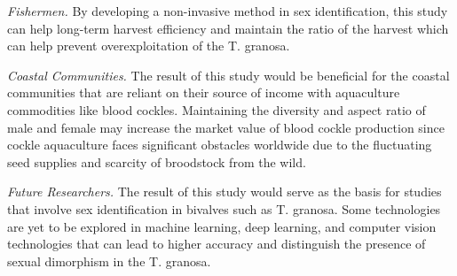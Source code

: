  \textit{Fishermen.} By developing a non-invasive method in sex identification, this study can help long-term harvest efficiency and maintain the ratio of the harvest which can help prevent overexploitation of the T. granosa.

 \textit{Coastal Communities.} The result of this study would be beneficial for the coastal communities that are reliant on their source of income with aquaculture commodities like blood cockles. Maintaining the diversity and aspect ratio of male and female may increase the market value of blood cockle production since cockle aquaculture faces significant obstacles worldwide due to the fluctuating seed supplies and scarcity of broodstock from the wild. 

 \textit{Future Researchers.} The result of this study would serve as the basis for studies that involve sex identification in bivalves such as T. granosa. Some technologies are yet to be explored in machine learning, deep learning, and computer vision technologies that can lead to higher accuracy and distinguish the presence of sexual dimorphism in the T. granosa.


